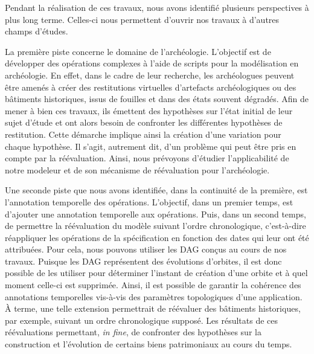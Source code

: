 Pendant la réalisation de ces travaux, nous avons identifié plusieurs
perspectives à plus long terme. %
Celles-ci nous permettent d'ouvrir nos travaux à d'autres champs d'études.

La première piste concerne le domaine de l'archéologie. %
L'objectif est de développer des opérations complexes à l'aide de scripts pour
la modélisation en archéologie. %
En effet, dans le cadre de leur recherche, les archéologues peuvent être amenés
à créer des restitutions virtuelles d'artefacts archéologiques ou des bâtiments
historiques, issus de fouilles et dans des états souvent dégradés. %
Afin de mener à bien ces travaux, ils émettent des hypothèses sur l'état initial
de leur sujet d'étude et ont alors besoin de confronter les différentes
hypothèses de restitution. %
Cette démarche implique ainsi la création d'une variation pour chaque
hypothèse. %
Il s'agit, autrement dit, d'un problème qui peut être pris en compte par la
réévaluation. %
Ainsi, nous prévoyons d'étudier l'applicabilité de notre modeleur et de son
mécanisme de réévaluation pour l'archéologie. %


Une seconde piste que nous avons identifiée, dans la continuité de la première,
est l'annotation temporelle des opérations. %
L'objectif, dans un premier temps, est d'ajouter une annotation temporelle aux opérations. %
Puis, dans un second temps, de permettre la réévaluation du modèle suivant
l'ordre chronologique, c'est-à-dire réappliquer les opérations de la
spécification en fonction des dates qui leur ont été attribuées. %
Pour cela, nous pouvons utiliser les DAG conçus au cours de nos travaux. %
Puisque les DAG représentent des évolutions d'orbites, il est donc possible de les
utiliser pour déterminer l'instant de création d'une orbite et à quel moment
celle-ci est supprimée. %
Ainsi, il est possible de garantir la cohérence des annotations temporelles
vis-à-vis des paramètres topologiques d'une application. %
À terme, une telle extension permettrait de réévaluer des bâtiments historiques, par
exemple, suivant un ordre chronologique supposé. %
Les résultats de ces réévaluations permettant, \textit{in fine}, de confronter
des hypothèses sur la construction et l'évolution de certains biens patrimoniaux
au cours du temps. %

